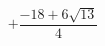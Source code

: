 \documentclass[preview]{standalone}
\begin{document}
\begin{align*}
+ \dfrac{-18 + 6\sqrt{13} }{4}
\end{align*}
\end{document}
